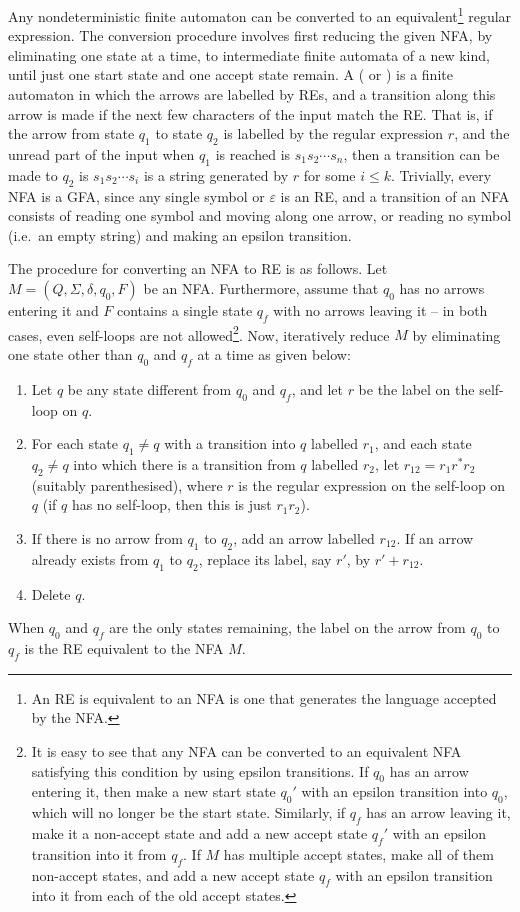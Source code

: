 Any nondeterministic finite automaton can be converted to an equivalent\footnote{An RE is equivalent to an NFA is one that generates the language accepted by the NFA.} regular expression. The conversion procedure involves first reducing the given NFA, by eliminating one state at a time, to intermediate finite automata of a new kind, until just one start state and one accept state remain. A  ( or ) is a finite automaton in which the arrows are labelled by REs, and a transition along this arrow is made if the next few characters of the input match the RE. That is, if the arrow from state $q_1$ to state $q_2$ is labelled by the regular expression $r$, and the unread part of the input when $q_1$ is reached is $s_1 s_2 \cdots s_n$, then a transition can be made to $q_2$ is $s_1 s_2 \cdots s_i$ is a string generated by $r$ for some $i \le k$. Trivially, every NFA is a GFA, since any single symbol or $\varepsilon$ is an RE, and a transition of an NFA consists of reading one symbol and moving along one arrow, or reading no symbol (i.e.\ an empty string) and making an epsilon transition.

The procedure for converting an NFA to RE is as follows. Let $M = (Q, \Sigma, \delta, q_0, F)$ be an NFA. Furthermore, assume that $q_0$ has no arrows entering it and $F$ contains a single state $q_f$ with no arrows leaving it -- in both cases, even self-loops are not allowed\footnote{It is easy to see that any NFA can be converted to an equivalent NFA satisfying this condition by using epsilon transitions. If $q_0$ has an arrow entering it, then make a new start state $q_0'$ with an epsilon transition into $q_0$, which will no longer be the start state. Similarly, if $q_f$ has an arrow leaving it, make it a non-accept state and add a new accept state $q_f'$ with an epsilon transition into it from $q_f$. If $M$ has multiple accept states, make all of them non-accept states, and add a new accept state $q_f$ with an epsilon transition into it from each of the old accept states.}. Now, iteratively reduce $M$ by eliminating one state other than $q_0$ and $q_f$ at a time as given below:
\begin{enumerate}
\item Let $q$ be any state different from $q_0$ and $q_f$, and let $r$ be the label on the self-loop on $q$.
\item For each state $q_1 \ne q$ with a transition into $q$ labelled $r_1$, and each state $q_2 \ne q$ into which there is a transition from $q$ labelled $r_2$, let $r_{12} = r_1 r^* r_2$ (suitably parenthesised), where $r$ is the regular expression on the self-loop on $q$ (if $q$ has no self-loop, then this is just $r_1 r_2$).
\item If there is no arrow from $q_1$ to $q_2$, add an arrow labelled $r_{12}$. If an arrow already exists from $q_1$ to $q_2$, replace its label, say $r'$, by $r' + r_{12}$.
\item Delete $q$.
\end{enumerate}
When $q_0$ and $q_f$ are the only states remaining, the label on the arrow from $q_0$ to $q_f$ is the RE equivalent to the NFA $M$.

